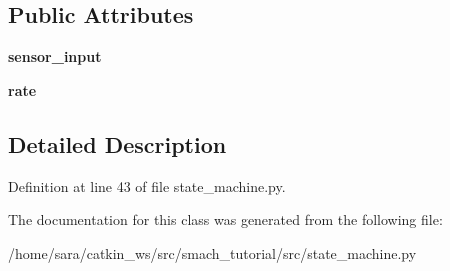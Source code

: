 \subsection*{Public Attributes}
\begin{DoxyCompactItemize}
\item 
\mbox{\label{classstate__machine_1_1Locked_af607507989a4d5039974490e8abada1a}} 
{\bfseries sensor\+\_\+input}
\item 
\mbox{\label{classstate__machine_1_1Locked_a667605824c2d371f1a62b18280a29a02}} 
{\bfseries rate}
\end{DoxyCompactItemize}


\subsection{Detailed Description}


Definition at line 43 of file state\+\_\+machine.\+py.



The documentation for this class was generated from the following file\+:\begin{DoxyCompactItemize}
\item 
/home/sara/catkin\+\_\+ws/src/smach\+\_\+tutorial/src/state\+\_\+machine.\+py\end{DoxyCompactItemize}
